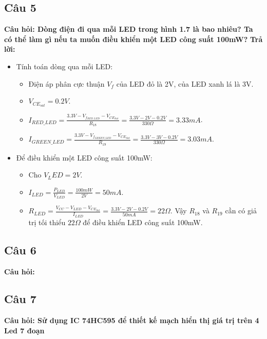 \subsection{Câu 5}
 \textbf{Câu hỏi: Dòng điện đi qua mỗi LED trong hình 1.7 là bao nhiêu? Ta có thể làm gì nếu ta muốn điều khiển một LED công suất 100mW?}
\textbf{Trả lời:}
\begin{itemize}
    \item Tính toán dòng qua mỗi LED:
    \begin{itemize}
        \item Điện áp phân cực thuận $V_f$ của LED đỏ là 2V, của LED xanh lá là 3V.
        \item $V_{CE_{sat}} = 0.2V$.
        \item $I_{RED\_LED} = \frac{3.3V - V_{f_{RED\_LED}} - V_{CE_{Sat}}}{R_{18}} = \frac{3.3V - 2V - 0.2V}{330\Omega} = 3.33mA$.
        \item $I_{GREEN\_LED} = \frac{3.3V - V_{f_{GREEN\_LED}} - V_{CE_{Sat}}}{R_{19}} = \frac{3.3V - 3V - 0.2V}{330\Omega} = 3.03mA$.
    \end{itemize}
    \item Để điều khiển một LED công suất 100mW:
    \begin{itemize}
        \item Cho $V_LED = 2V$.
        \item $I_{LED} = \frac{P_{LED}}{V_{LED}} = \frac{100mW}{2V} = 50mA$.
        \item $R_{LED} = \frac{V_{CC} - V_{LED} - V_{CE_{Sat}}}{I_{LED}} = \frac{3.3V - 2V - 0.2V}{50mA} = 22\Omega$.
        Vậy $R_{18}$ và $R_{19}$ cần có giả trị tối thiểu $22\Omega$ để điều khiển LED công suất 100mW.
    \end{itemize}
\end{itemize}
\pagebreak
\subsection{Câu 6}
\textbf{Câu hỏi: }

\pagebreak
\subsection{Câu 7}
\textbf{Câu hỏi: Sử dụng IC 74HC595 để thiết kế mạch hiển thị giá trị trên 4 Led 7 đoạn}
